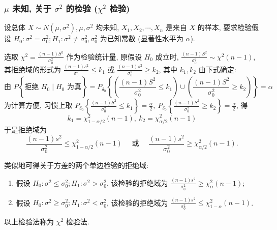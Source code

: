 \subsubsection{\texorpdfstring{$\mu$}. 未知, 关于 \texorpdfstring{$\sigma^2$}. 的检验 (\texorpdfstring{$\chi^2$}. 检验)}

设总体 $ X \sim N\left(\mu, \sigma^{2}\right), \mu, \sigma^{2} $ 均未知, $X_{1}, X_{2}, \cdots, X_{n} $ 是来自 $ X $ 的样本, 要求检验假设 $ H_{0}: \sigma^{2}=\sigma_{0}^{2} ; H_{1}: \sigma^{2} \neq \sigma_{0}^{2}, \sigma_{0}^{2} $ 为已知常数 (显著性水平为 $ \alpha $).

选取 $\displaystyle \chi^{2}=\frac{(n-1) S^{2}}{\sigma_{0}^{2}} $ 作为检验统计量, 原假设 $ H_{0} $ 成立时, $\displaystyle \frac{(n-1) S^{2}}{\sigma_{0}^{2}} \sim \chi^{2}(n-1)$, 其拒绝域的形式为 $\displaystyle \frac{(n-1) s^{2}}{\sigma_{0}^{2}} \leqslant k_{1} $ 或 $\displaystyle \frac{(n-1) s^{2}}{\sigma_{0}^{2}} \geqslant k_{2} $, 其中 $ k_{1}, k_{2} $ 由下式确定:
$$\text{由 }  P\left\{ \right. \text{拒绝 }  H_{0} \mid H_{0} \left.  \text{ 为真}  \right\}=P_{\delta_{0}}\left\{\left(\frac{(n-1) S^{2}}{\sigma_{0}^{2}} \leqslant k_{1}\right) \cup\left(\frac{(n-1) S^{2}}{\sigma_{0}^{2}} \geqslant k_{2}\right)\right\}=\alpha$$
为计算方便, 习惯上取 $\displaystyle P_{\delta_{0}}\left\{\frac{(n-1) S^{2}}{\sigma_{0}^{2}} \leqslant k_{1}\right\}=\frac{\alpha}{2},~ P_{\delta_0}\left\{\frac{(n-1) S^{2}}{\sigma_{0}^{2}} \geqslant k_{2}\right\}=\frac{\alpha}{2} $, 得 $$ k_{1}=\chi_{1-\alpha / 2}^{2}(n-1) ,~  k_{2}=\chi_{\alpha / 2}^{2}(n-1) $$
于是拒绝域为
$$\frac{(n-1) s^{2}}{\sigma_{0}^{2}} \leqslant \chi_{1-\alpha / 2}^{2}(n-1) \quad \text { 或 } \quad \frac{(n-1) s^{2}}{\sigma_{0}^{2}} \geqslant \chi_{\alpha / 2}^{2}(n-1) .$$

类似地可得关于方差的两个单边检验的拒绝域:

\begin{enumerate}[label=(\arabic{*})]
    \item 假设 $ H_{0}: \sigma^{2} \leqslant \sigma_{0}^{2} ; H_{1}: \sigma^{2}>\sigma_{0}^{2} $, 该检验的拒绝域为 $\displaystyle \frac{(n-1) s^{2}}{\sigma_{0}^{2}} \geqslant \chi_{\alpha}^{2}(n-1) $;
    \item 假设 $ H_{0}: \sigma^{2} \geqslant \sigma_{0}^{2} ; H_{1}: \sigma^{2}<\sigma_{0}^{2} $, 该检验的拒绝域为 $\displaystyle \frac{(n-1) s^{2}}{\sigma_{0}^{2}} \leqslant \chi_{1-\alpha}^{2}(n-1) $.
\end{enumerate}
以上检验法称为 $ \chi^{2} $ 检验法.

